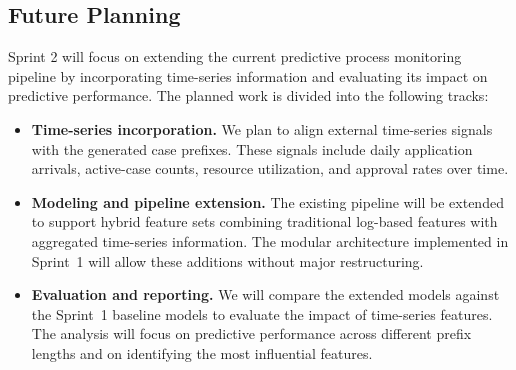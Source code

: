 \documentclass[runningheads]{llncs}
\begin{document}
\subsection{Future Planning}

Sprint 2 will focus on extending the current predictive process monitoring pipeline by incorporating time-series information and evaluating its impact on predictive performance. The planned work is divided into the following tracks:

\begin{itemize}
    \item \textbf{Time-series incorporation.}
          We plan to align external time-series signals with the generated case prefixes. These signals include daily application arrivals, active-case counts, resource utilization, and approval rates over time.

    \item \textbf{Modeling and pipeline extension.}
          The existing pipeline will be extended to support hybrid feature sets combining traditional log-based features with aggregated time-series information. The modular architecture implemented in Sprint~1 will allow these additions without major restructuring.

    \item \textbf{Evaluation and reporting.}
          We will compare the extended models against the Sprint~1 baseline models to evaluate the impact of time-series features. The analysis will focus on predictive performance across different prefix lengths and on identifying the most influential features.
\end{itemize}




\end{document}
